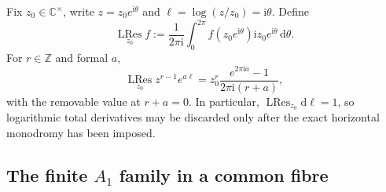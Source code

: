 \documentclass[11pt,a4paper]{article}
\numberwithin{equation}{section}
\theoremstyle{remark}
\newcommand{\LRes}{\operatorname*{LRes}}
\newcommand{\ii}{\mathrm{i}}
\newcommand{\dd}{\mathrm{d}}
\begin{document}
Fix $z_0\in\mathbb C^\times$, write $z=z_0e^{\ii\theta}$ and
$\ell=\log(z/z_0)=\ii\theta$.  Define
\begin{equation}
 \LRes_{z_0}f
 :=\frac1{2\pi\ii}\int_0^{2\pi}f(z_0e^{\ii\theta})
 \ii z_0e^{\ii\theta}\,\dd\theta.
 \label{eq:log-residue}
\end{equation}
For $r\in\mathbb Z$ and formal $a$,
\begin{equation}
 \LRes_{z_0}z^{r-1}e^{a\ell}
 =z_0^r\frac{e^{2\pi\ii a}-1}{2\pi\ii(r+a)},
 \label{eq:log-residue-monomial}
\end{equation}
with the removable value at $r+a=0$.  In particular,
$\LRes_{z_0}\dd\ell=1$, so logarithmic total derivatives may be discarded only after the exact
horizontal monodromy has been imposed.

\subsection*{The finite \texorpdfstring{$A_1$}{A1} family in a common fibre}
\end{document}
